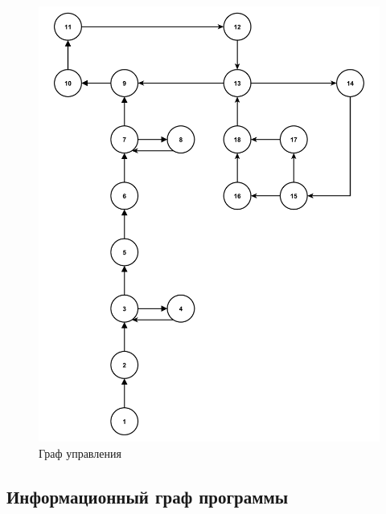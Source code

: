 \begin{figure}[h]
	\centering
	\includegraphics[height=0.7\textheight]{img/граф_управления.pdf}
	\caption{Граф управления}
	\label{fg:gu}
\end{figure}

\clearpage

\subsection{Информационный граф программы}

